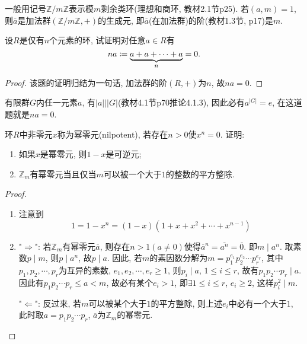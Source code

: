 \begin{remark}
    一般用记号$\mathbb{Z}/m\mathbb{Z}$表示模$m$剩余类环(理想和商环, 教材2.1节p25). 若$(a, m) = 1$, 则$\overline{a}$是加法群$(\mathbb{Z}/m\mathbb{Z}, +)$的生成元, 即$\overline{a}$(在加法群)的阶(教材1.3节, p17)是$m$.
\end{remark}

\begin{problem}
    设$R$是仅有$n$个元素的环, 试证明对任意$a \in R$有
    \[
        na \mathrel{\coloneqq} \underbrace{a + a + \cdots + a}_n = 0.
    \]
\end{problem}
    
\begin{proof}
    该题的证明归结为一句话, 加法群的阶$(R, +)$为$n$, 故$na = 0$.
\end{proof}

\begin{remark}
    有限群$G$内任一元素$a$, 有$|a| \Big| |G|$(教材4.1节p70推论4.1.3), 因此必有$a^{|G|} = e$, 在这道题就是$na = 0$.
\end{remark}

\begin{problem}
    环$R$中非零元$x$称为幂零元(nilpotent), 若存在$n > 0$使$x^n = 0$. 证明:
    \begin{enumerate}[(1)]
        \item 如果$x$是幂零元, 则$1 - x$是可逆元;
        \item $\mathbb{Z}_m$有幂零元当且仅当$m$可以被一个大于$1$的整数的平方整除.
    \end{enumerate}
\end{problem}

\begin{proof}
    \begin{enumerate}[(1)]
        \item 注意到
        \[
            1 = 1 - x^n = (1 - x)(1 + x + x^2 + \cdots + x^{n - 1})
        \]
        \item "$\Rightarrow$": 若$\mathbb{Z}_m$有幂零元$\overline{a}$, 则存在$n > 1(a \neq 0)$使得$\overline{a}^n = \overline{a^n} = \overline{0}$. 即$m \mid a^n$. 取素数$p \mid m$, 则$p \mid a^n$, 故$p \mid a$. 因此, 若$m$的素因数分解为$m = p_1^{e_1}p_2^{e_2}\cdots p_r^{e_r}$, 其中$p_1, p_2, \cdots, p_r$为互异的素数, $e_1, e_2, \cdots, e_r \geqslant 1$, 则$p_i \mid a,\, 1 \leqslant i \leqslant r$, 故有$p_1p_2\cdots p_r \mid a$. 因此有$p_1p_2\cdots p_r \leqslant a < m$, 故必有某个$e_i > 1$, 即$\exists 1 \leqslant i \leqslant r$, $e_i \geqslant 2$, 这样$p_i^2 \mid m$.
        
        "$\Leftarrow$": 反过来, 若$m$可以被某个大于$1$的平方整除, 则上述$e_i$中必有一个大于$1$, 此时取$a = p_1p_2\cdots p_r$, $\overline{a}$为$\mathbb{Z}_m$的幂零元.
    \end{enumerate}
\end{proof}

